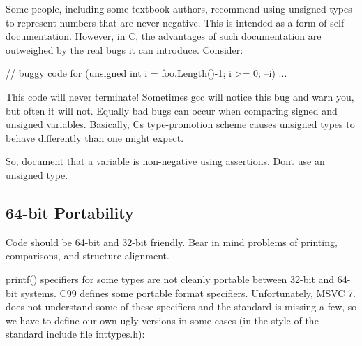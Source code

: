 Some people, including some textbook authors, recommend using unsigned types to represent numbers that are never negative. This is intended as a form of self-\/documentation. However, in C, the advantages of such documentation are outweighed by the real bugs it can introduce. Consider\+:


\begin{DoxyCode}
\textcolor{comment}{// buggy code}
\textcolor{keywordflow}{for} (\textcolor{keywordtype}{unsigned} \textcolor{keywordtype}{int} i = foo.Length()-1; i >= 0; --i) ...
\end{DoxyCode}


This code will never terminate! Sometimes gcc will notice this bug and warn you, but often it will not. Equally bad bugs can occur when comparing signed and unsigned variables. Basically, C\textquotesingle{}s type-\/promotion scheme causes unsigned types to behave differently than one might expect.

So, document that a variable is non-\/negative using assertions. Don\textquotesingle{}t use an unsigned type.

\subsection*{64-\/bit Portability}

Code should be 64-\/bit and 32-\/bit friendly. Bear in mind problems of printing, comparisons, and structure alignment.


\begin{DoxyItemize}
\item {\ttfamily printf()} specifiers for some types are not cleanly portable between 32-\/bit and 64-\/bit systems. C99 defines some portable format specifiers. Unfortunately, M\+S\+VC 7. does not understand some of these specifiers and the standard is missing a few, so we have to define our own ugly versions in some cases (in the style of the standard include file inttypes.\+h)\+:
\end{DoxyItemize}





